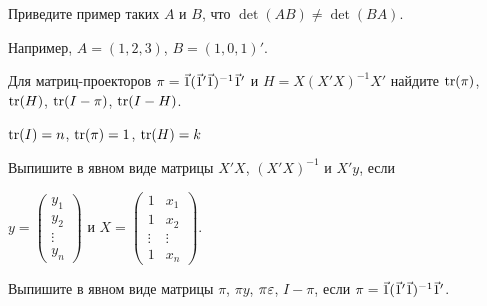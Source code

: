 \begin{problem}
Приведите пример таких $A$ и $B$, что $\det(AB)\neq \det(BA)$.
\begin{sol}
Например, $A=(1,2,3)$, $B=(1,0, 1)'$.
\end{sol}
\end{problem}


\begin{problem}
Для матриц-проекторов $\pi=\v1(\v1'\v1)^{-1}\v1'$ и $H=X(X'X)^{-1}X'$ найдите $\operatorname{tr}(\pi)$, $\operatorname{tr}(H)$, $\operatorname{tr}(I-\pi)$, $\operatorname{tr}(I-H)$.


\begin{sol}
$\operatorname{tr}(I)=n$, $\operatorname{tr}(\pi)=1$, $\operatorname{tr}(H)=k$
\end{sol}
\end{problem}



\begin{problem}
Выпишите в явном виде матрицы $X'X$, $(X'X)^{-1}$ и $X'y$, если

$y=\left(
\begin{array}{c}
y_1 \\
y_2 \\
\vdots \\
y_n
\end{array}\right)$ и
$X=\left(
\begin{array}{cc}
1 & x_1 \\
1 & x_2 \\
\vdots & \vdots \\
1 & x_n
\end{array}\right)$.


\begin{sol}
\end{sol}
\end{problem}



\begin{problem}
Выпишите в явном виде матрицы $\pi$, $\pi y$, $\pi \varepsilon$, $I-\pi$, если $\pi=\v1(\v1'\v1)^{-1}\v1'$.


\begin{sol}
\end{sol}
\end{problem}



